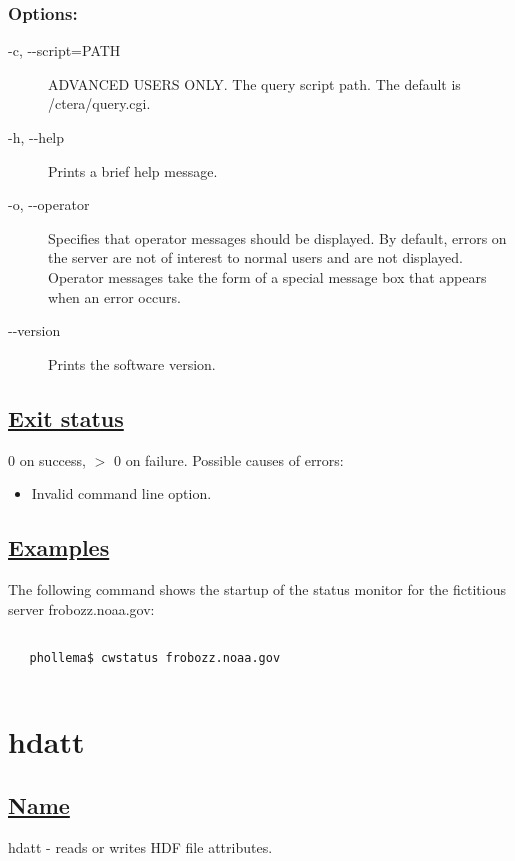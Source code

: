 \subsubsection*{Options:}
\begin{description}
\item[ -c, -{-}script=PATH ] ADVANCED USERS ONLY. The query script path. The default is /ctera/query.cgi. 
\item[ -h, -{-}help ] Prints a brief help message. 
\item[ -o, -{-}operator ] Specifies that operator messages should be displayed. By default, errors on the server are not of interest to normal users and are not displayed. Operator messages take the form of a special message box that appears when an error occurs.
\item[-{-}version]Prints the software version.

\end{description}
\subsection*{\underline{Exit status}}


  0 on success, $>$ 0 on failure. Possible causes of errors:
\begin{itemize}
\item  Invalid command line option. 

\end{itemize}
\subsection*{\underline{Examples}}


  The following command shows the startup of the status monitor for the fictitious server frobozz.noaa.gov:
\begin{verbatim}

   phollema$ cwstatus frobozz.noaa.gov
 
\end{verbatim}

\newpage
\section{hdatt} \hypertarget{hdatt}{}
\subsection*{\underline{Name}}


   hdatt - reads or writes HDF file attributes.  
